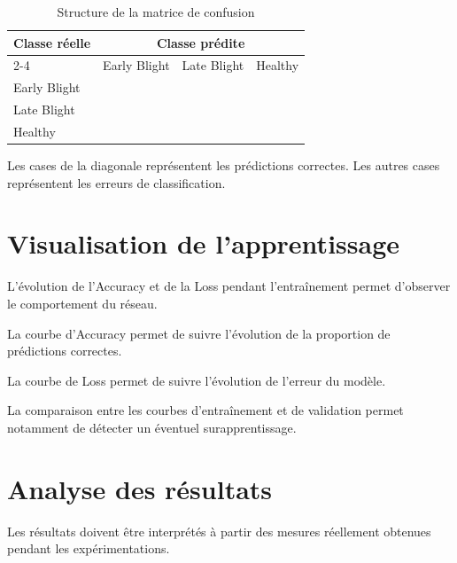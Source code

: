 \documentclass[12pt,a4paper,oneside]{report}
\begin{document}
\begin{table}[H]
\centering
\caption{Structure de la matrice de confusion}
\begin{tabular}{lccc}
\toprule
\multirow{2}{*}{\textbf{Classe réelle}} &
\multicolumn{3}{c}{\textbf{Classe prédite}}\\
\cmidrule(lr){2-4}
& Early Blight & Late Blight & Healthy\\
\midrule
Early Blight & & &\\
Late Blight & & &\\
Healthy & & &\\
\bottomrule
\end{tabular}
\end{table}

Les cases de la diagonale représentent les prédictions
correctes. Les autres cases représentent les erreurs
de classification.

\section{Visualisation de l'apprentissage}

L'évolution de l'Accuracy et de la Loss pendant
l'entraînement permet d'observer le comportement
du réseau.

La courbe d'Accuracy permet de suivre l'évolution
de la proportion de prédictions correctes.

La courbe de Loss permet de suivre l'évolution
de l'erreur du modèle.

La comparaison entre les courbes d'entraînement
et de validation permet notamment de détecter
un éventuel surapprentissage.

%
%

\section{Analyse des résultats}

Les résultats doivent être interprétés à partir des
mesures réellement obtenues pendant les expérimentations.
\end{document}
